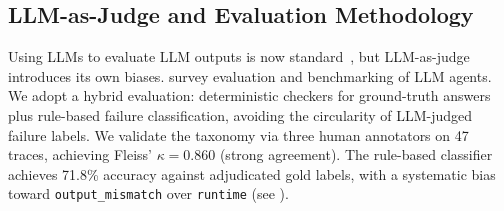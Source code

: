 \subsection{LLM-as-Judge and Evaluation Methodology}
Using LLMs to evaluate LLM outputs is now standard~\citep{li2025from,gao2025llmbased}, but LLM-as-judge introduces its own biases. \citet{mohammadi2025evaluation} survey evaluation and benchmarking of LLM agents. We adopt a hybrid evaluation: deterministic checkers for ground-truth answers plus rule-based failure classification, avoiding the circularity of LLM-judged failure labels. We validate the taxonomy via three human annotators on 47 traces, achieving Fleiss' $\kappa = 0.860$ (strong agreement). The rule-based classifier achieves 71.8\% accuracy against adjudicated gold labels, with a systematic bias toward \texttt{output\_mismatch} over \texttt{runtime} (see ).
